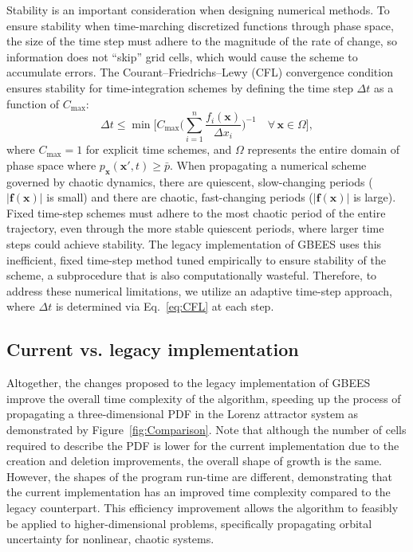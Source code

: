 \documentclass[paper,11pt]{AAS}
\begin{document}
Stability is an important consideration when designing numerical methods. To ensure stability when time-marching discretized functions through phase space, the size of the time step must adhere to the magnitude of the rate of change, so information does not ``skip'' grid cells, which would cause the scheme to accumulate errors. The Courant–Friedrichs–Lewy (CFL) convergence condition \cite{CFL} ensures stability for time-integration schemes by defining the time step $\Delta t$ as a function of $C_{\max}$:
\begin{equation}\label{eq:CFL}
    \Delta t \leq \min \Bigg[ C_{\max} \Bigg(\sum_{i=1}^n \frac{f_i(\mathbf{x})}{\Delta x_i} \Bigg)^{-1} \quad \forall\, \mathbf{x} \in \Omega \Bigg],
\end{equation}
where $C_{\max}=1$ for explicit time schemes, and $\Omega$ represents the entire domain of phase space where $p_{\mathbf{x}}(\mathbf{x}',t) \geq \bar{p}$. When propagating a numerical scheme governed by chaotic dynamics, there are quiescent, slow-changing periods ($|\mathbf{f}(\mathbf{x})|$ is small) and there are chaotic, fast-changing periods ($|\mathbf{f}(\mathbf{x})|$ is large). Fixed time-step schemes must adhere to the most chaotic period of the entire trajectory, even through the more stable quiescent periods, where larger time steps could achieve stability. The legacy implementation of GBEES uses this inefficient, fixed time-step method tuned empirically to ensure stability of the scheme, a subprocedure that is also computationally wasteful. Therefore, to address these numerical limitations, we utilize an adaptive time-step approach, where $\Delta t$ is determined via Eq.~\eqref{eq:CFL} at each step. 

\subsection{Current vs. legacy implementation}
Altogether, the changes proposed to the legacy implementation of GBEES improve the overall time complexity of the algorithm, speeding up the process of propagating a three-dimensional PDF in the Lorenz attractor system as demonstrated by Figure~\ref{fig:Comparison}. Note that although the number of cells required to describe the PDF is lower for the current implementation due to the creation and deletion improvements, the overall shape of growth is the same. However, the shapes of the program run-time are different, demonstrating that the current implementation has an improved time complexity compared to the legacy counterpart. This efficiency improvement allows the algorithm to feasibly be applied to higher-dimensional problems, specifically propagating orbital uncertainty for nonlinear, chaotic systems. 
\end{document}
